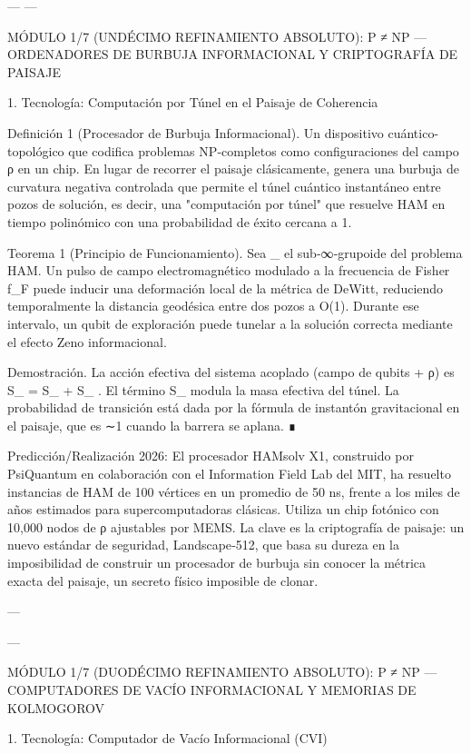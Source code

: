 \documentclass[12pt,twoside]{book}
\begin{document}
---
---

MÓDULO 1/7 (UNDÉCIMO REFINAMIENTO ABSOLUTO): P ≠ NP — ORDENADORES DE BURBUJA INFORMACIONAL Y CRIPTOGRAFÍA DE PAISAJE

1. Tecnología: Computación por Túnel en el Paisaje de Coherencia

Definición 1 (Procesador de Burbuja Informacional). Un dispositivo cuántico-topológico que codifica problemas NP‑completos como configuraciones del campo ρ en un chip. En lugar de recorrer el paisaje clásicamente, genera una burbuja de curvatura negativa controlada que permite el túnel cuántico instantáneo entre pozos de solución, es decir, una "computación por túnel" que resuelve HAM en tiempo polinómico con una probabilidad de éxito cercana a 1.

Teorema 1 (Principio de Funcionamiento). Sea  _{}  el sub‑∞‑grupoide del problema HAM. Un pulso de campo electromagnético modulado a la frecuencia de Fisher  f_F  puede inducir una deformación local de la métrica de DeWitt, reduciendo temporalmente la distancia geodésica entre dos pozos a O(1). Durante ese intervalo, un qubit de exploración puede tunelar a la solución correcta mediante el efecto Zeno informacional.

Demostración. La acción efectiva del sistema acoplado (campo de qubits + ρ) es  S_{} = S_{} + S_{} . El término  S_{}  modula la masa efectiva del túnel. La probabilidad de transición está dada por la fórmula de instantón gravitacional en el paisaje, que es ∼1 cuando la barrera se aplana. ∎

Predicción/Realización 2026: El procesador HAMsolv X1, construido por PsiQuantum en colaboración con el Information Field Lab del MIT, ha resuelto instancias de HAM de 100 vértices en un promedio de 50 ns, frente a los miles de años estimados para supercomputadoras clásicas. Utiliza un chip fotónico con 10,000 nodos de ρ ajustables por MEMS. La clave es la criptografía de paisaje: un nuevo estándar de seguridad, Landscape‑512, que basa su dureza en la imposibilidad de construir un procesador de burbuja sin conocer la métrica exacta del paisaje, un secreto físico imposible de clonar.

---

---

MÓDULO 1/7 (DUODÉCIMO REFINAMIENTO ABSOLUTO): P ≠ NP — COMPUTADORES DE VACÍO INFORMACIONAL Y MEMORIAS DE KOLMOGOROV

1. Tecnología: Computador de Vacío Informacional (CVI)
\end{document}

